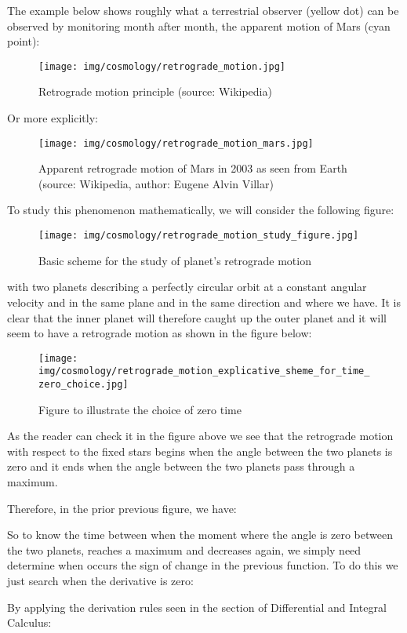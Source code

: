 	The example below shows roughly what a terrestrial observer (yellow dot) can be observed by monitoring month after month, the apparent motion of Mars (cyan point):
	\begin{figure}[H]
		\centering
		\texttt{[image: img/cosmology/retrograde\_motion.jpg]}	
		\caption[Retrograde motion principle]{Retrograde motion principle (source: Wikipedia)}
	\end{figure}
	Or more explicitly:
	\begin{figure}[H]
		\centering
		\texttt{[image: img/cosmology/retrograde\_motion\_mars.jpg]}	
		\caption[Apparent retrograde motion of Mars in 2003 as seen from Earth]{Apparent retrograde motion of Mars in 2003 as seen from Earth (source: Wikipedia, author: Eugene Alvin Villar)}
	\end{figure}
	To study this phenomenon mathematically, we will consider the following figure:
	\begin{figure}[H]
		\centering
		\texttt{[image: img/cosmology/retrograde\_motion\_study\_figure.jpg]}	
		\caption{Basic scheme for the study of planet's retrograde motion}
	\end{figure}
	with two planets describing a perfectly circular orbit at a constant angular velocity and in the same plane and in the same direction and where we have. It is clear that the inner planet will therefore caught up the outer planet and it will seem to have a retrograde motion as shown in the figure below:
	\begin{figure}[H]
		\centering
		\texttt{[image: img/cosmology/retrograde\_motion\_explicative\_sheme\_for\_time\_zero\_choice.jpg]}	
		\caption[]{Figure to illustrate the choice of zero time}
	\end{figure}
	As the reader can check it in the figure above we see that the retrograde motion with respect to the fixed stars begins when the angle between the two planets is zero and it ends when the angle between the two planets pass through a maximum.

	Therefore, in the prior previous figure, we have:
	
	So to know the time between when the moment where the angle is zero between the two planets, reaches a maximum and decreases again, we simply need determine when occurs the sign of change in the previous function. To do this we just search when the derivative is zero:
	
	By applying the derivation rules seen in the section of Differential and Integral Calculus:
	
